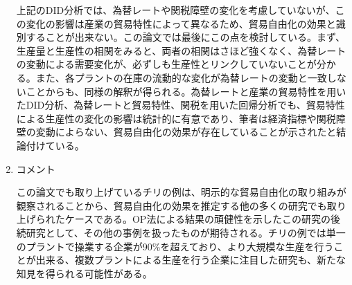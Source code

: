 \documentclass{jsarticle}
\begin{document}
\begin{enumerate}
上記のDID分析では、為替レートや関税障壁の変化を考慮していないが、この変化の影響は産業の貿易特性によって異なるため、貿易自由化の効果と識別することが出来ない。この論文では最後にこの点を検討している。まず、生産量と生産性の相関をみると、両者の相関はさほど強くなく、為替レートの変動による需要変化が、必ずしも生産性とリンクしていないことが分かる。また、各プラントの在庫の流動的な変化が為替レートの変動と一致しないことからも、同様の解釈が得られる。為替レートと産業の貿易特性を用いたDID分析、為替レートと貿易特性、関税を用いた回帰分析でも、貿易特性による生産性の変化の影響は統計的に有意であり、筆者は経済指標や関税障壁の変動によらない、貿易自由化の効果が存在していることが示されたと結論付けている。

\item コメント

この論文でも取り上げているチリの例は、明示的な貿易自由化の取り組みが観察されることから、貿易自由化の効果を推定する他の多くの研究でも取り上げられたケースである。OP法による結果の頑健性を示したこの研究の後続研究として、その他の事例を扱ったものが期待される。チリの例では単一のプラントで操業する企業が90\%を超えており、より大規模な生産を行うことが出来る、複数プラントによる生産を行う企業に注目した研究も、新たな知見を得られる可能性がある。

\end{enumerate}
\end{document}
